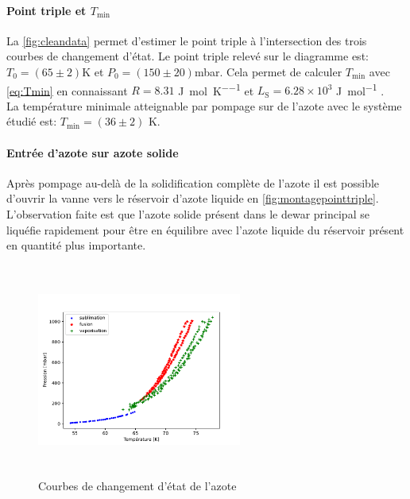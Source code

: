 \paragraph*{Point triple et \(T_\textrm{min}\)}
La \autoref{fig:cleandata} permet d'estimer le point triple à l'intersection des trois courbes de changement d'état. Le point triple relevé sur le diagramme est: \(T_\textrm{0} = (65 \pm 2)\)\si{\kelvin} et \(P_\textrm{0} = (150 \pm 20)\)\si{\milli \bar}. Cela permet de calculer \(T_\textrm{min}\) avec \autoref{eq:Tmin} en connaissant \(R = 8.31\) \si{\joule \per \mole \per \kelvin} et \(L_\textrm{S} = 6.28 \times 10^{3}\) \si{\joule \per \mole} \cite{Azote}.\\
La température minimale atteignable par pompage sur de l'azote avec le système étudié est: \(T_\textrm{min} = (36 \pm 2) \) \si{\kelvin}.

\paragraph*{Entrée d'azote sur azote solide}
Après pompage au-delà de la solidification complète de l'azote il est possible d'ouvrir la vanne vers le réservoir d'azote liquide en \autoref{fig:montagepointtriple}. L'observation faite est que l'azote solide présent dans le dewar principal se liquéfie rapidement pour être en équilibre avec l'azote liquide du réservoir présent en quantité plus importante.



\begin{figure}
    \centering
    \includegraphics[width=0.6\textwidth, height=7cm]{figures/etats_azote_clean.pdf}
    \caption{Courbes de changement d'état de l'azote}
    \label{fig:cleandata}
\end{figure}




